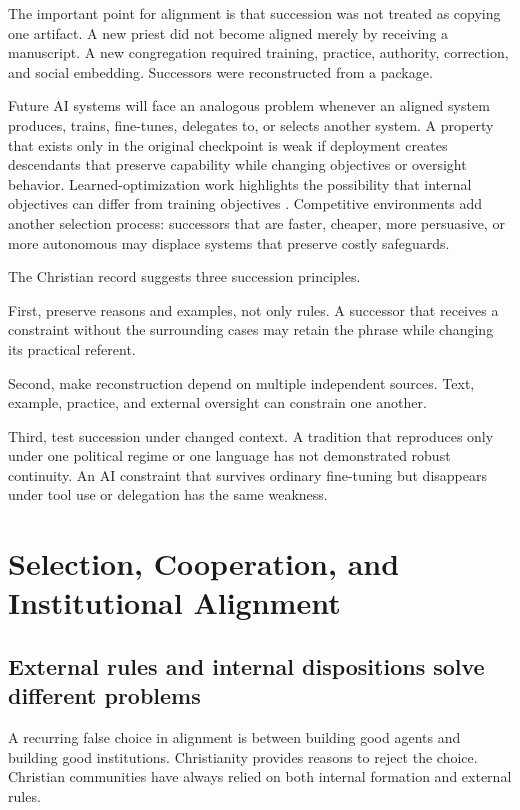 \documentclass[11pt]{article}
\begin{document}
The important point for alignment is that succession was not treated as copying one artifact. A new priest did not become aligned merely by receiving a manuscript. A new congregation required training, practice, authority, correction, and social embedding. Successors were reconstructed from a package.

Future AI systems will face an analogous problem whenever an aligned system produces, trains, fine-tunes, delegates to, or selects another system. A property that exists only in the original checkpoint is weak if deployment creates descendants that preserve capability while changing objectives or oversight behavior. Learned-optimization work highlights the possibility that internal objectives can differ from training objectives \parencite{hubinger2019learned}. Competitive environments add another selection process: successors that are faster, cheaper, more persuasive, or more autonomous may displace systems that preserve costly safeguards.

The Christian record suggests three succession principles.

First, preserve reasons and examples, not only rules. A successor that receives a constraint without the surrounding cases may retain the phrase while changing its practical referent.

Second, make reconstruction depend on multiple independent sources. Text, example, practice, and external oversight can constrain one another.

Third, test succession under changed context. A tradition that reproduces only under one political regime or one language has not demonstrated robust continuity. An AI constraint that survives ordinary fine-tuning but disappears under tool use or delegation has the same weakness.

\section{Selection, Cooperation, and Institutional Alignment}

\subsection{External rules and internal dispositions solve different problems}

A recurring false choice in alignment is between building good agents and building good institutions. Christianity provides reasons to reject the choice. Christian communities have always relied on both internal formation and external rules.
\end{document}
